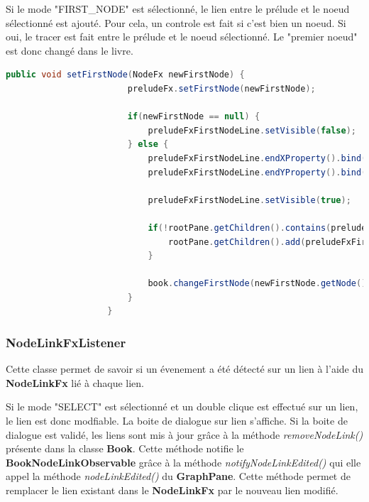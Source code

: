 				Si le mode "FIRST\_NODE" est sélectionné, le lien entre le prélude et le noeud sélectionné est ajouté. Pour cela, un controle est fait si c'est bien un noeud. Si oui, le tracer est fait entre le prélude et le noeud sélectionné. Le "premier noeud" est donc changé dans le livre.
				\begin{lstlisting}[gobble=20, language=java, caption=Classe NodeFxListener avec le mode FIRST NODE]
					public void setFirstNode(NodeFx newFirstNode) {
						preludeFx.setFirstNode(newFirstNode);

						if(newFirstNode == null) {
							preludeFxFirstNodeLine.setVisible(false);
						} else {
							preludeFxFirstNodeLine.endXProperty().bind(newFirstNode.xProperty().add(newFirstNode.widthProperty().divide(2)));
							preludeFxFirstNodeLine.endYProperty().bind(newFirstNode.yProperty().add(newFirstNode.heightProperty().divide(2)));

							preludeFxFirstNodeLine.setVisible(true);

							if(!rootPane.getChildren().contains(preludeFxFirstNodeLine)) {
								rootPane.getChildren().add(preludeFxFirstNodeLine);
							}

							book.changeFirstNode(newFirstNode.getNode());
						}
					}
				\end{lstlisting}

			\subsubsection{NodeLinkFxListener}
				Cette classe permet de savoir si un évenement a été détecté sur un lien à l'aide du \textbf{NodeLinkFx} lié à chaque lien.

				Si le mode "SELECT" est sélectionné et un double clique est effectué sur un lien, le lien est donc modfiable. La boite de dialogue sur lien s'affiche. Si la boite de dialogue est validé, les liens sont mis à jour grâce à la méthode \textit{removeNodeLink()} présente dans la classe \textbf{Book}. Cette méthode notifie le \textbf{BookNodeLinkObservable} grâce à la méthode \textit{notifyNodeLinkEdited()} qui elle appel la méthode \textit{nodeLinkEdited()} du \textbf{GraphPane}. Cette méthode permet de remplacer le lien existant dans le \textbf{NodeLinkFx} par le nouveau lien modifié.

